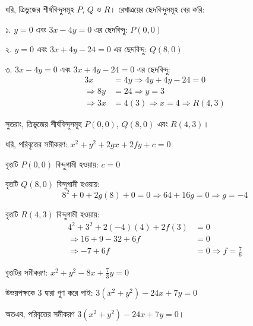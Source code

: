 \documentclass[12pt, a4paper]{article}
\begin{document}
\begin{tcolorbox}[solutionbox={সমাধান (Solution)}]
    \noindent
    ধরি, ত্রিভুজের শীর্ষবিন্দুসমূহ $P$, $Q$ ও $R$। রেখাত্রয়ের ছেদবিন্দুসমূহ বের করি:
    
    \vspace{0.5em}
    ১. $y = 0$ এবং $3x - 4y = 0$ এর ছেদবিন্দু: $P(0, 0)$
    
    \vspace{0.5em}
    ২. $y = 0$ এবং $3x + 4y - 24 = 0$ এর ছেদবিন্দু: $Q(8, 0)$
    
    \vspace{0.5em}
    ৩. $3x - 4y = 0$ এবং $3x + 4y - 24 = 0$ এর ছেদবিন্দু: 
    \begin{align*}
        3x &= 4y \Rightarrow 4y + 4y - 24 = 0 \\
        \Rightarrow 8y &= 24 \Rightarrow y = 3 \\
        \Rightarrow 3x &= 4(3) \Rightarrow x = 4 \Rightarrow R(4, 3)
    \end{align*}
    
    \vspace{0.5em}
    সুতরাং, ত্রিভুজের শীর্ষবিন্দুসমূহ $P(0, 0)$, $Q(8, 0)$ এবং $R(4, 3)$।
    
    \vspace{0.5em}
    ধরি, পরিবৃত্তের সমীকরণ: $x^2 + y^2 + 2gx + 2fy + c = 0$
    
    \vspace{0.5em}
    বৃত্তটি $P(0, 0)$ বিন্দুগামী হওয়ায়: $c = 0$
    
    \vspace{0.5em}
    বৃত্তটি $Q(8, 0)$ বিন্দুগামী হওয়ায়: 
    \[ 8^2 + 0 + 2g(8) + 0 = 0 \Rightarrow 64 + 16g = 0 \Rightarrow g = -4 \]
    
    \vspace{0.5em}
    বৃত্তটি $R(4, 3)$ বিন্দুগামী হওয়ায়: 
    \begin{align*}
        4^2 + 3^2 + 2(-4)(4) + 2f(3) &= 0 \\
        \Rightarrow 16 + 9 - 32 + 6f &= 0 \\
        \Rightarrow -7 + 6f &= 0 \Rightarrow f = \frac{7}{6}
    \end{align*}
    
    \vspace{0.5em}
    বৃত্তটির সমীকরণ: $x^2 + y^2 - 8x + \frac{7}{3}y = 0$
    
    \vspace{0.5em}
    উভয়পক্ষকে $3$ দ্বারা গুণ করে পাই: $3(x^2 + y^2) - 24x + 7y = 0$
    
    \vspace{0.5em}
    অতএব, পরিবৃত্তের সমীকরণ $3(x^2 + y^2) - 24x + 7y = 0$।
\end{tcolorbox}
\end{document}
